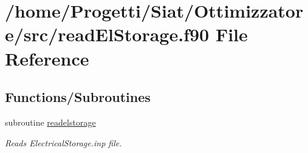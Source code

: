 \hypertarget{read_el_storage_8f90}{\section{/home/\-Progetti/\-Siat/\-Ottimizzatore/src/read\-El\-Storage.f90 File Reference}
\label{read_el_storage_8f90}
}
\subsection*{Functions/\-Subroutines}
\begin{DoxyCompactItemize}
\item 
subroutine \hyperlink{read_el_storage_8f90_a81103711b37b843984df33b7a8b45019}{readelstorage}
\begin{DoxyCompactList}\small\item\em Reads Electrical\-Storage.\-inp file. \end{DoxyCompactList}\end{DoxyCompactItemize}


